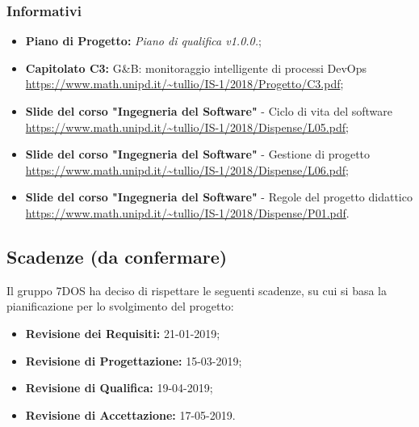 \subsubsection{Informativi}
\begin{itemize}
	\item \textbf{Piano di Progetto:} \emph{Piano di qualifica v1.0.0.};
	\item \textbf{Capitolato C3:} G\&B: monitoraggio intelligente di processi DevOps
 \\ \url{https://www.math.unipd.it/~tullio/IS-1/2018/Progetto/C3.pdf};
 	\item \textbf{Slide del corso "Ingegneria del Software"} - Ciclo di vita del software
 \\ \url{https://www.math.unipd.it/~tullio/IS-1/2018/Dispense/L05.pdf};
	\item \textbf{Slide del corso "Ingegneria del Software"} - Gestione di progetto
 \\ \url{https://www.math.unipd.it/~tullio/IS-1/2018/Dispense/L06.pdf};
 	\item \textbf{Slide del corso "Ingegneria del Software"} - Regole del progetto didattico
 \\ \url{https://www.math.unipd.it/~tullio/IS-1/2018/Dispense/P01.pdf}.
 
\end{itemize}

\subsection{Scadenze (da confermare)}
Il gruppo 7DOS ha deciso di rispettare le seguenti scadenze, su cui si basa la pianificazione per lo svolgimento del progetto:
\begin{itemize}
	\item \textbf{Revisione dei Requisiti:} 21-01-2019;
	\item \textbf{Revisione di Progettazione:} 15-03-2019;
	\item \textbf{Revisione di Qualifica:} 19-04-2019;
	\item \textbf{Revisione di Accettazione:} 17-05-2019.
\end{itemize}

\pagebreak